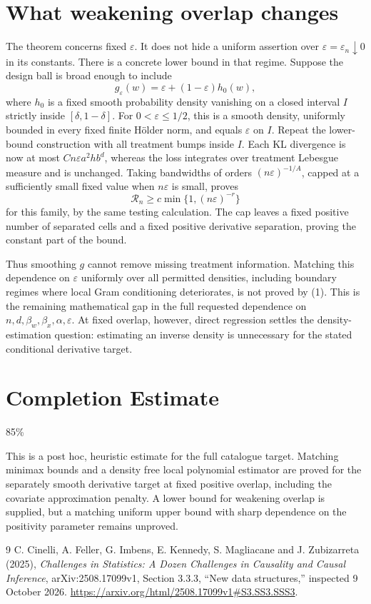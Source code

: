 \documentclass[11pt]{article}
\theoremstyle{remark}\newtheorem{remark}[theorem]{Remark}
\begin{document}
\section{What weakening overlap changes}
The theorem concerns fixed $\varepsilon$. It does not hide a uniform assertion over $\varepsilon=\varepsilon_n\downarrow0$ in its constants. There is a concrete lower bound in that regime. Suppose the design ball is broad enough to include
\[
 g_\varepsilon(w)=\varepsilon+(1-\varepsilon)h_0(w),
\]
where $h_0$ is a fixed smooth probability density vanishing on a closed interval $I$ strictly inside $[\delta,1-\delta]$. For $0<\varepsilon\leq1/2$, this is a smooth density, uniformly bounded in every fixed finite H\"older norm, and equals $\varepsilon$ on $I$. Repeat the lower-bound construction with all treatment bumps inside $I$. Each KL divergence is now at most $Cn\varepsilon a^2hb^d$, whereas the loss integrates over treatment Lebesgue measure and is unchanged. Taking bandwidths of orders $(n\varepsilon)^{-1/A}$, capped at a sufficiently small fixed value when $n\varepsilon$ is small, proves
\[
 \mathcal R_n\geq c\min\{1,(n\varepsilon)^{-r}\}
\]
for this family, by the same testing calculation. The cap leaves a fixed positive number of separated cells and a fixed positive derivative separation, proving the constant part of the bound.

Thus smoothing $g$ cannot remove missing treatment information. Matching this dependence on $\varepsilon$ uniformly over all permitted densities, including boundary regimes where local Gram conditioning deteriorates, is not proved by (1). This is the remaining mathematical gap in the full requested dependence on $n,d,\beta_w,\beta_x,\alpha,\varepsilon$. At fixed overlap, however, direct regression settles the density-estimation question: estimating an inverse density is unnecessary for the stated conditional derivative target.

\section{Completion Estimate}
85\%

This is a post hoc, heuristic estimate for the full catalogue target.
Matching minimax bounds and a density free local polynomial estimator are proved for the separately smooth derivative target at fixed positive overlap, including the covariate approximation penalty. A lower bound for weakening overlap is supplied, but a matching uniform upper bound with sharp dependence on the positivity parameter remains unproved.

\begin{thebibliography}{9}
 C. Cinelli, A. Feller, G. Imbens, E. Kennedy, S. Magliacane and J. Zubizarreta (2025), \emph{Challenges in Statistics: A Dozen Challenges in Causality and Causal Inference}, arXiv:2508.17099v1, Section 3.3.3, ``New data structures,'' inspected 9 October 2026. \url{https://arxiv.org/html/2508.17099v1#S3.SS3.SSS3}.
\end{thebibliography}
\end{document}
